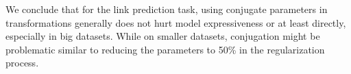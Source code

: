 \documentclass[11pt]{article}
\begin{document}
We conclude that for the link prediction task, using conjugate parameters in transformations generally does not hurt model expressiveness or at least directly, especially in big datasets.
While on smaller datasets, conjugation might be problematic similar to reducing the parameters to 50\% in the regularization process.

\begin{table}
\centering
{}


\end{table}
\end{document}
